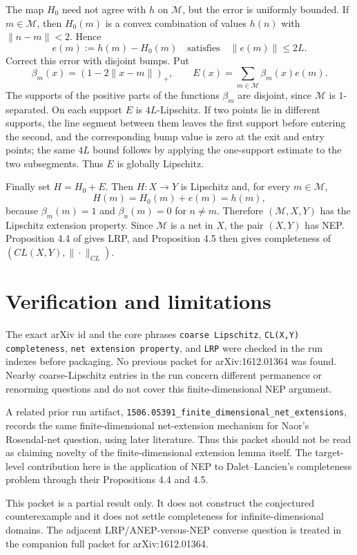\documentclass[11pt]{article}
\newcommand{\M}{\mathcal{M}}
\begin{document}
The map \(H_0\) need not agree with \(h\) on \(\M\), but the error is
uniformly bounded.  If \(m\in \M\), then \(H_0(m)\) is a convex combination
of values \(h(n)\) with \(\|n-m\|<2\).  Hence
\[
  e(m):=h(m)-H_0(m) \quad\text{satisfies}\quad \|e(m)\|\le 2L.
\]
Correct this error with disjoint bumps.  Put
\[
  \beta_m(x)=(1-2\|x-m\|)_+,\qquad
  E(x)=\sum_{m\in \M}\beta_m(x)e(m).
\]
The supports of the positive parts of the functions \(\beta_m\) are
disjoint, since \(\M\) is \(1\)-separated.  On each support \(E\) is
\(4L\)-Lipschitz.  If two points lie in different supports, the line segment
between them leaves the first support before entering the second, and the
corresponding bump value is zero at the exit and entry points; the same
\(4L\) bound follows by applying the one-support estimate to the two
subsegments.  Thus \(E\) is globally Lipschitz.

Finally set \(H=H_0+E\).  Then \(H:X\to Y\) is Lipschitz and, for every
\(m\in \M\),
\[
  H(m)=H_0(m)+e(m)=h(m),
\]
because \(\beta_m(m)=1\) and \(\beta_n(m)=0\) for \(n\ne m\).  Therefore
\((\M,X,Y)\) has the Lipschitz extension property.  Since \(\M\) is a net in
\(X\), the pair \((X,Y)\) has NEP.  Proposition 4.4 of
\cite{DaletLancien} gives LRP, and Proposition 4.5 then gives completeness of
\((CL(X,Y),\|\cdot\|_{CL})\).

\section*{Verification and limitations}

The exact arXiv id and the core phrases \texttt{coarse Lipschitz},
\texttt{CL(X,Y) completeness}, \texttt{net extension property}, and
\texttt{LRP} were checked in the run indexes before packaging.  No previous
packet for arXiv:1612.01364 was found.  Nearby coarse-Lipschitz entries in
the run concern different permanence or renorming questions and do not cover
this finite-dimensional NEP argument.

A related prior run artifact,
\texttt{1506.05391\_finite\_dimensional\_net\_extensions}, records the same
finite-dimensional net-extension mechanism for Naor's Rosendal-net question,
using later literature.  Thus this packet should not be read as claiming
novelty of the finite-dimensional extension lemma itself.  The target-level
contribution here is the application of NEP to Dalet--Lancien's completeness
problem through their Propositions 4.4 and 4.5.

This packet is a partial result only.  It does not construct the conjectured
counterexample and it does not settle completeness for infinite-dimensional
domains.  The adjacent LRP/ANEP-versus-NEP converse question is treated in
the companion full packet for arXiv:1612.01364.
\end{document}
